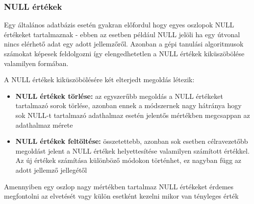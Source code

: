 \subsubsection{NULL értékek}
Egy általános adatbázis esetén gyakran előfordul hogy egyes oszlopok NULL értékeket tartalmaznak - ebben az esetben például NULL jelöli ha egy útvonal nincs elérhető adat egy adott jellemzőről. Azonban a gépi tanulási algoritmusok számokat képesek feldolgozni így elengedhetetlen a NULL értékek kiküszöbölése valamilyen formában.

A NULL értékek kiküszöbölésére két elterjedt megoldás létezik:
\begin{itemize}
	\item \textbf{NULL értékek törlése:} az egyszerűbb megoldás a NULL értékeket tartalmazó sorok törlése, azonban ennek a módszernek nagy hátránya hogy sok NULL-t tartalmazó adathalmaz esetén jelentős mértékben megcsappan az adathalmaz mérete
	\item \textbf{NULL értékek feltöltése:} összetettebb, azonban sok esetben célravezetőbb megoldást jelent a NULL értékek helyettesítése valamilyen számított értékkel. Az új értékek számítása különböző módokon történhet, ez nagyban függ az adott jellemző jellegétől
\end{itemize}
Amennyiben egy oszlop nagy mértékben tartalmaz NULL értékeket érdemes megfontolni az elvetését vagy külön esetként kezelni mikor van tényleges érték

